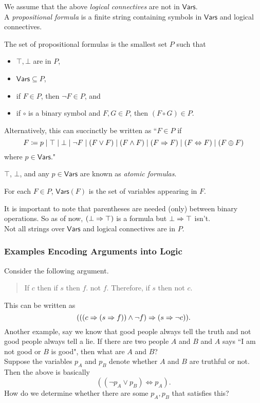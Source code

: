 We assume that the above \textit{logical connectives} are not in $\mathsf{Vars}$.\\
A \textit{propositional formula} is a finite string containing symbols in $\mathsf{Vars}$ and logical connectives.

\begin{definition}
The set of propositional formulas is the smallest set $P$ such that
\begin{itemize}
	\item $\top,\bot$ are in $P$,
	\item $\mathsf{Vars}\subseteq P$,
	\item if $F\in P$, then $\neg F\in P$, and
	\item if $\circ$ is a binary symbol and $F,G\in P$, then $(F\circ G)\in P$.
\end{itemize}
\end{definition}

Alternatively, this can succinctly be written as ``$F \in P$ if
\[F \coloneqq p\mid\top\mid\bot\mid \neg F \mid (F\vee F) \mid (F\wedge F) \mid (F\Rightarrow F) \mid (F\Leftrightarrow F) \mid (F\oplus F) \]
where $p\in\mathsf{Vars}$."

\begin{definition}
$\top$, $\bot$, and any $p\in\mathsf{Vars}$ are known as \textit{atomic formulas}.
\end{definition}

\begin{definition}
For each $F\in P$, $\mathsf{Vars}(F)$ is the set of variables appearing in $F$.
\end{definition}

It is important to note that parentheses are needed (only) between binary operations. So as of now, $(\bot\Rightarrow\top)$ is a formula but $\bot\Rightarrow\top$ isn't.\\
Not all strings over $\mathsf{Vars}$ and logical connectives are in $P$.

\subsubsection{Examples Encoding Arguments into Logic}

Consider the following argument.
\begin{quote}
	If $c$ then if $s$ then $f$. not $f$. Therefore, if $s$ then not $c$.
\end{quote}
This can be written as
\[ (((c\Rightarrow (s\Rightarrow f)) \wedge \neg f) \Rightarrow (s \Rightarrow \neg c)). \]
Another example, say we know that good people always tell the truth and not good people always tell a lie. If there are two people $A$ and $B$ and $A$ says ``I am not good or $B$ is good", then what are $A$ and $B$?\\
Suppose the variables $p_A$ and $p_B$ denote whether $A$ and $B$ are truthful or not. Then the above is basically
\[ ((\neg p_A \vee p_B) \iff p_A). \]
How do we determine whether there are some $p_A,p_B$ that satisfies this?

